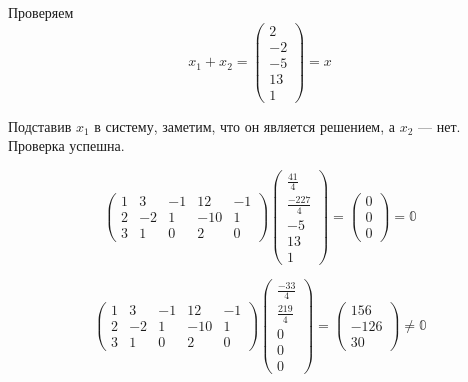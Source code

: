 \documentclass[12pt, a4paper]{article}
\begin{document}
    Проверяем
    \begin{equation}
        x_1 + x_2 = \begin{pmatrix}
            2 \\ -2 \\ -5 \\ 13 \\ 1            
        \end{pmatrix} = x
    \end{equation}

    Подставив $x_1$ в систему, заметим, что он является решением, 
    а $x_2$ — нет. Проверка успешна.

    \begin{equation}
        \left(\begin{matrix}
            1 & 3 & -1 & 12 & -1 \\
            2 & -2 & 1 & -10 & 1 \\
            3 & 1 & 0 & 2 & 0
            \end{matrix}\right) \left(\begin{matrix}
                \frac{41}{4} \\
                \frac{-227}{4} \\
                -5 \\
                13 \\
                1
                \end{matrix}\right) = \left(\begin{matrix}
                    0 \\
                    0 \\
                    0
                    \end{matrix}\right) = \mathbb{0}
    \end{equation}

    \begin{equation}
        \left(\begin{matrix}
            1 & 3 & -1 & 12 & -1 \\
            2 & -2 & 1 & -10 & 1 \\
            3 & 1 & 0 & 2 & 0
        \end{matrix}\right) \left(\begin{matrix}
            \frac{-33}{4} \\
            \frac{219}{4} \\
            0 \\
            0 \\
            0
        \end{matrix}\right) = \left(\begin{matrix}
            156 \\
            -126 \\
            30
        \end{matrix}\right) \neq \mathbb{0}
    \end{equation}
\end{document}
